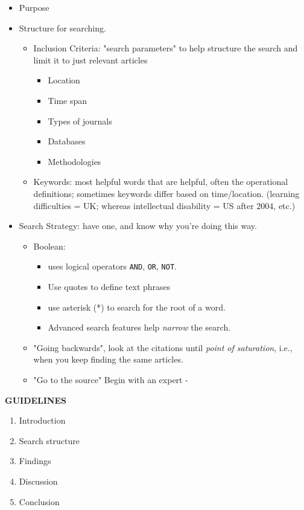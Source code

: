 \documentclass{TC}
\begin{document}
\begin{multicols}{2}
	\begin{itemize}
	\item Purpose
	\item Structure for searching.
		\begin{itemize}	
		\item Inclusion Criteria: "search parameters" to help structure the search and limit it to just relevant articles
			\begin{itemize}
			\item Location
			\item Time span
			\item Types of journals
			\item Databases
			\item Methodologies			
			\end{itemize}
		\item Keywords: most helpful words that are helpful, often the operational definitions; sometimes keywords differ based on time/location. (learning difficulties = UK; whereas intellectual disability = US after 2004, etc.) 
		\end{itemize}
	\item Search Strategy: have one, and know why you're doing this way.
		\begin{itemize}
		\item Boolean:
			\begin{itemize}
			\item uses logical operators \texttt{AND}, \texttt{OR}, \texttt{NOT}.
			\item Use quotes to define text phrases
			\item use asterisk (*) to search for the root of a word.
			\item Advanced search features help \emph{narrow} the search.
			\end{itemize}
		\item "Going backwards", look at the citations until \emph{point of saturation}, i.e., when you keep finding the same articles.
		\item "Go to the source" Begin with an expert - 
		\end{itemize}
	\end{itemize}
\end{multicols}
\textbf{GUIDELINES}
	\begin{multicols}{3}
	\begin{enumerate}
	\item Introduction
	\item Search structure
	\item Findings
	\item Discussion
	\item Conclusion
	\end{enumerate}
	\end{multicols}
\end{document}
